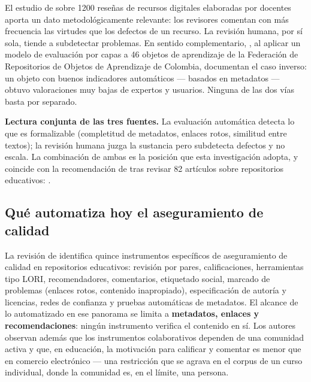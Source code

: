 El estudio de \textcite{xie2018systematic} sobre 1200 reseñas de recursos digitales
elaboradas por docentes aporta un dato metodológicamente relevante: los revisores
comentan con más frecuencia las virtudes que los defectos de un recurso. La revisión
humana, por sí sola, tiende a subdetectar problemas. En sentido complementario,
\textcite{tabares2017modelo}, al aplicar un modelo de evaluación por capas a 46
objetos de aprendizaje de la Federación de Repositorios de Objetos de Aprendizaje de
Colombia, documentan el caso inverso: un objeto con buenos indicadores automáticos
--- basados en metadatos --- obtuvo valoraciones muy bajas de expertos y usuarios.
Ninguna de las dos vías basta por separado.

\begin{estado}
\small
\textbf{Lectura conjunta de las tres fuentes.} La evaluación automática detecta lo
que es formalizable (completitud de metadatos, enlaces rotos, similitud entre
textos); la revisión humana juzga la sustancia pero subdetecta defectos y no escala.
La combinación de ambas es la posición que esta investigación adopta, y coincide con
la recomendación de \textcite{clements2015open} tras revisar 82 artículos sobre
repositorios educativos: .
\end{estado}

\subsection{Qué automatiza hoy el aseguramiento de calidad}
\label{sec:contexto-automatizacion}

La revisión de \textcite{clements2015open} identifica quince instrumentos
específicos de aseguramiento de calidad en repositorios educativos: revisión por
pares, calificaciones, herramientas tipo LORI, recomendadores, comentarios,
etiquetado social, marcado de problemas (enlaces rotos, contenido inapropiado),
especificación de autoría y licencias, redes de confianza y pruebas automáticas de
metadatos. El alcance de lo automatizado en ese panorama se limita a
\textbf{metadatos, enlaces y recomendaciones}: ningún instrumento verifica el
contenido en sí. Los autores observan además que los instrumentos colaborativos
dependen de una comunidad activa y que, en educación, la motivación para calificar y
comentar es menor que en comercio electrónico --- una restricción que se agrava en
el corpus de un curso individual, donde la comunidad es, en el límite, una persona.

